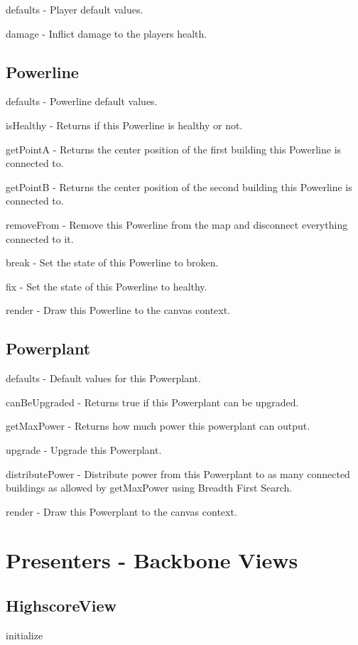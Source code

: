 	defaults - Player default values.

	damage - Inflict damage to the players health.

\subsection*{Powerline}

	defaults - Powerline default values.

	isHealthy - Returns if this Powerline is healthy or not.

	getPointA - Returns the center position of the first building this Powerline is connected to.

	getPointB - Returns the center position of the second building this Powerline is connected to.

	removeFrom - Remove this Powerline from the map and disconnect everything connected to it.

	break - Set the state of this Powerline to broken.

	fix - Set the state of this Powerline to healthy.

	render - Draw this Powerline to the canvas context.

\subsection*{Powerplant}

	defaults - Default values for this Powerplant.

	canBeUpgraded - Returns true if this Powerplant can be upgraded.

	getMaxPower - Returns how much power this powerplant can output.

	upgrade - Upgrade this Powerplant.

	distributePower - Distribute power from this Powerplant to as many connected buildings as allowed by getMaxPower using Breadth First Search.

	render - Draw this Powerplant to the canvas context.

\clearpage

\section{Presenters - Backbone Views}

\subsection*{HighscoreView}
	initialize
	
